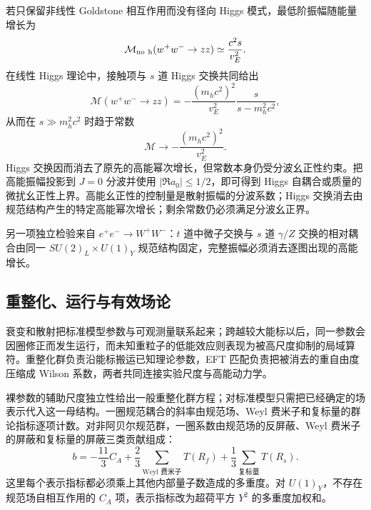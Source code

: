 若只保留非线性 Goldstone 相互作用而没有径向 Higgs 模式，最低阶振幅随能量增长为
\begin{equation*}
\mathcal M_{\rm no\ h}(w^+w^-\to zz)\simeq\frac{c^2s}{v_E^2}.
\end{equation*}
在线性 Higgs 理论中，接触项与 $s$ 道 Higgs 交换共同给出
\begin{equation}
\mathcal M(w^+w^-\to zz)
=-\frac{(m_hc^2)^2}{v_E^2}\frac{s}{s-m_h^2c^2},
\label{eq:ww-higgs-full-amplitude-dp32}
\end{equation}
从而在 $s\gg m_h^2c^2$ 时趋于常数
\begin{equation}
\boxed{
\mathcal M\longrightarrow-\frac{(m_hc^2)^2}{v_E^2}.}
\label{eq:ww-high-energy-constant-dp11}
\end{equation}
Higgs 交换因而消去了原先的高能幂次增长，但常数本身仍受分波幺正性约束。把高能振幅投影到 $J=0$ 分波并使用 $|\Re a_0|\le1/2$，即可得到 Higgs 自耦合或质量的微扰幺正性上界。高能幺正性的控制量是散射振幅的分波系数；Higgs 交换消去由规范结构产生的特定高能幂次增长；剩余常数仍必须满足分波幺正界。

另一项独立检验来自 $e^+e^-\to W^+W^-$：$t$ 道中微子交换与 $s$ 道 $\gamma/Z$ 交换的相对耦合由同一 $SU(2)_L\times U(1)_Y$ 规范结构固定，完整振幅必须消去逐图出现的高能增长。







\subsection{重整化、运行与有效场论}

衰变和散射把标准模型参数与可观测量联系起来；跨越较大能标以后，同一参数会因圈修正而发生运行，而未知重粒子的低能效应则表现为被高尺度抑制的局域算符。重整化群负责沿能标搬运已知理论参数，EFT 匹配负责把被消去的重自由度压缩成 Wilson 系数，两者共同连接实验尺度与高能动力学。




裸参数的辅助尺度独立性给出一般重整化群方程；对标准模型只需把已经确定的场表示代入这一母结构。一圈规范耦合的斜率由规范场、Weyl 费米子和复标量的群论指标逐项计数。对非阿贝尔规范群，一圈系数由规范场的反屏蔽、Weyl 费米子的屏蔽和复标量的屏蔽三类贡献组成：
\begin{equation}
\boxed{
b=-\frac{11}{3}C_A
+\frac23\sum_{\text{Weyl 费米子}}T(R_f)
+\frac13\sum_{\text{复标量}}T(R_s).}
\label{eq:general-gauge-beta-weyl-scalar-dp11}
\end{equation}
这里每个表示指标都必须乘上其他内部量子数造成的多重度。对 $U(1)_Y$，不存在规范场自相互作用的 $C_A$ 项，表示指标改为超荷平方 $Y^2$ 的多重度加权和。

